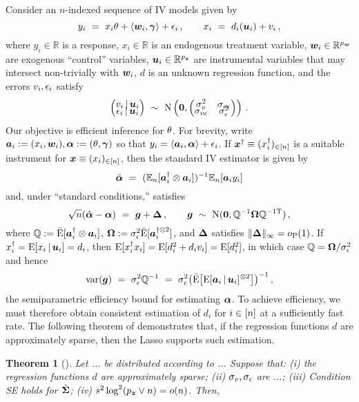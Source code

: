 \documentclass{uwstat572}
\newcommand{\benn}{\begin{equation*}}
\newcommand{\eenn}{\end{equation*}}
\newtheorem{thm}{Theorem}[section]
\theoremstyle{definition}
\theoremstyle{remark}
\newcommand{\R}{\ensuremath{\mathbb{R}}}
\newcommand{\Q}{\mathbb{Q}}
\newcommand{\Prb}{\mathrm{P}}
\newcommand{\E}{\mathrm{E}}
\newcommand{\var}{\mathrm{var}}
\newcommand{\Normal}{\mathrm{N}}
\newcommand{\bs}[1]{\boldsymbol{#1}}
\numberwithin{equation}{section}
\begin{document}
Consider an $n$-indexed sequence of IV models given by
\benn
	y_i \ = \ x_i\regt + \langle\w_i, \regg\rangle + \ersi\,, \qquad x_i \ = \ d_i(\u_i) + \erfi \,,
\eenn
where $y_i \in \R$ is a response, $x_i \in \R$ is an endogenous treatment variable, $\w_i\in\R^{\pw}$ are exogenous ``control'' variables, $\u_i \in \R^{\pz}$ are instrumental variables that may intersect non-trivially with $\w_i$, $d$ is an unknown regression function, and the errors $v_i, \epsilon_i$ satisfy
\benn
	\begin{pmatrix} \erfi \,|\, \u_i \\[-.5em] \ersi \,|\, \u_i \end{pmatrix} \ \sim \ \Normal\left(\bs{0}, \begin{pmatrix} \sdf^2 & \sdfs \\[-.5em] \sdfs & \sds^2 \end{pmatrix} \right)\,.
\eenn
Our objective is efficient inference for $\theta$. For brevity, write $\a_i := (x_i, \w_i), \rega := (\regt, \regg)$ so that $y_i = \langle \a_i, \rega \rangle + \ersi$. If $\xinst \equiv (\xinsti)_{\inn}$ is a suitable instrument for $\x \equiv (x_i)_{\inn}$, then the standard IV estimator is given by
\benn
	\regahat \ = \ (\En[\ainst_i \kp \a_i])^{-1}\En[\a_i y_i] 
\eenn 
and, under ``standard conditions,'' satisfies
\benn
	\sqrt{n}(\regahat - \rega) \ = \ \g + \rm\,, \qquad \g \ \sim \ \Normal(\bs{0}, \Q^{-1}\Om\Q^{-1\tp})\,,
\eenn
where $\Q := \EEn[\ainst_i \kp \a_i]$, $\Om := \sds^2\EEn[\ainstkpt_i]$, and $\rm$ satisfies $\|\rm\|_\infty = o_{\Prb}(1)$. If $\xinsti = \E[x_i\,|\,\u_i] = d_i$, then $\E[\xinsti x_i] = \E[d_i^2 + d_i\erfi] = \E[d_i^2]$, in which case $\Q = \Om/\sds^2$ and hence
\benn
	\var(\g) \ = \ \sds^2\Q^{-1} \ = \ \sds^2\big(\EEn\big[ \E[\a_i\,|\,\u_i]^{\kpt} \big]\big)^{-1} \,,
\eenn
the semiparametric efficiency bound for estimating $\rega$.  To achieve efficiency, we must therefore obtain consistent estimation of $d_i$ for $i\in[n]$ at a sufficiently fast rate. The following theorem of \cite{BCH11} demonstrates that, if the regression functions $d$ are approximately sparse, then the Lasso supports such estimation.  
\begin{thm}[{\cite[Theorem 3]{BCH11}}]
Let ... be distributed according to ... Suppose that: (i) the regression functions $d$ are approximately sparse;  (ii) $\sigma_v, \sigma_\epsilon$ are ...; (iii) Condition SE holds for $\gramhat$; (iv) $\sb^2\log^2(\pz\vee n) = o(n)$. Then,
%	
\end{thm}
\end{document}
